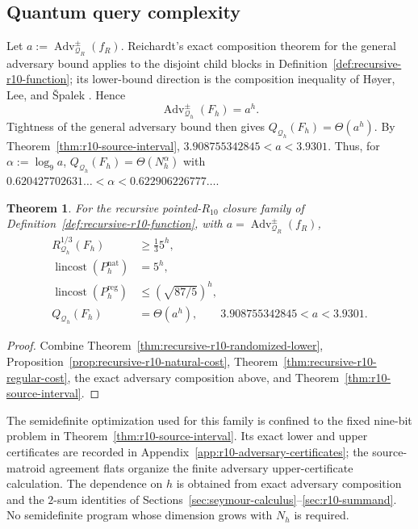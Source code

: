 \documentclass[11pt]{article}
\numberwithin{equation}{section}
\newtheorem{theorem}[definition]{Theorem}
\theoremstyle{remark}
\begin{document}
\subsection{Quantum query complexity}

Let $a:=\operatorname{Adv}^{\pm}_{\mathcal Q_R}(f_R)$. Reichardt's exact
composition theorem for the general adversary bound
\cite[Theorem~7.2]{Reichardt2009} applies to the disjoint child blocks in
Definition~\ref{def:recursive-r10-function}; its lower-bound direction is the
composition inequality of H{\o}yer, Lee, and {\v S}palek
\cite{HoyerLeeSpalek2007}. Hence
\begin{equation}
    \operatorname{Adv}^{\pm}_{\mathcal Q_h}(F_h)=a^h.
\end{equation}
Tightness of the general adversary bound
\cite{Reichardt2011,Reichardt2014Equivalent} then gives
$Q_{\mathcal Q_h}(F_h)=\Theta(a^h)$. By
Theorem~\ref{thm:r10-source-interval}, $3.908755342845<a<3.9301$. Thus, for
$\alpha:=\log_9 a$,
$Q_{\mathcal Q_h}(F_h)=\Theta(N_h^\alpha)$ with
$0.620427702631\ldots<\alpha<0.622906226777\ldots$.

\begin{theorem}
\label{thm:recursive-r10-comparison}
For the recursive pointed-$R_{10}$ closure family of
Definition~\ref{def:recursive-r10-function}, with
$a=\operatorname{Adv}^{\pm}_{\mathcal Q_R}(f_R)$,
\begin{equation}
\begin{aligned}
R^{1/3}_{\mathcal Q_h}(F_h)&\geq\tfrac13 5^h,\\
\operatorname{lincost}(P_h^{\mathrm{nat}})&=5^h,\\
\operatorname{lincost}(P_h^{\mathrm{reg}})&\leq(\sqrt{87/5})^h,\\
Q_{\mathcal Q_h}(F_h)&=\Theta(a^h),
\qquad 3.908755342845<a<3.9301.
\end{aligned}
\end{equation}
\end{theorem}

\begin{proof}
Combine Theorem~\ref{thm:recursive-r10-randomized-lower},
Proposition~\ref{prop:recursive-r10-natural-cost},
Theorem~\ref{thm:recursive-r10-regular-cost}, the exact adversary composition
above, and Theorem~\ref{thm:r10-source-interval}.
\end{proof}

The semidefinite optimization used for this family is confined to the fixed
nine-bit problem in Theorem~\ref{thm:r10-source-interval}.  Its exact lower
and upper certificates are recorded in
Appendix~\ref{app:r10-adversary-certificates}; the source-matroid agreement
flats organize the finite adversary upper-certificate calculation. The
dependence on $h$ is obtained from exact adversary composition and the
$2$-sum identities of
Sections~\ref{sec:seymour-calculus}--\ref{sec:r10-summand}.  No semidefinite program whose dimension grows with
$N_h$ is required.
\end{document}
